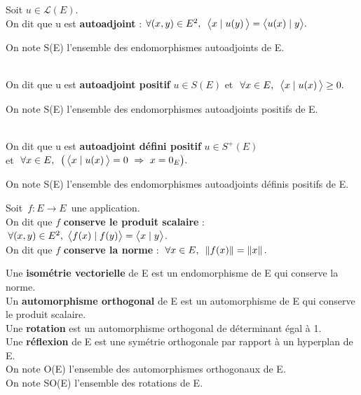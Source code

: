 Soit \(u\in \mathscr{L}(E)\).\vspace{0.1cm}\\
On dit que u est \textbf{autoadjoint} \ssi : \(\forall (x,y)\in E^2,\ \, \bigl\langle x\mid u(y)\, \bigr\rangle=\bigl\langle u(x)\mid y \bigr\rangle.\)\vspace{0.1cm}\\
\begin{small}
    On note S(E) l'ensemble des endomorphismes autoadjoints de E.
\end{small}\vspace{0.5cm}\\
On dit que u est \textbf{autoadjoint positif} \ssi \(u\in S(E)\) et \(\ \forall x\in E,\ \,\bigl\langle x\mid u(x)\, \bigr\rangle\geq 0.\)\vspace{0.1cm}\\
\begin{small}
    On note S\expo{+}(E) l'ensemble des endomorphismes autoadjoints positifs de E.
\end{small}\vspace{0.5cm}\\
On dit que u est \textbf{autoadjoint défini positif} \ssi \(u\in S^+(E)\)\\
et \(\ \forall x\in E,\ \,\bigl(\,\psm{x}{u(x)\,}=0\ \Rightarrow \ x=0_E \bigr).\)\vspace{0.1cm}\\
\begin{small}
    On note S\expo{++}(E) l'ensemble des endomorphismes autoadjoints définis positifs de E.
\end{small}

\vspace{1.3cm}

Soit \(\,f:E\to E\,\) une application.\vspace{0.1cm}\\
On dit que $f$ \textbf{conserve le produit scalaire} \ssi : \(\, \forall (x,y)\in E^2,\ \psm{f(x)}{f(y)}=\psm{x}{y}\).\vspace{0.2cm}\\
On dit que $f$ \textbf{conserve la norme} \ssi : \(\; \forall x\in E,\ \, \left\lVert f(x)\right\rVert=\left\lVert x\right\rVert.\)

\vspace{1cm}

\noindent Une \textbf{isométrie vectorielle} de E est un endomorphisme de E qui conserve la norme.\\
Un \textbf{automorphisme orthogonal} de E est un automorphisme de E qui conserve le produit scalaire.\\
Une \textbf{rotation} est un automorphisme orthogonal de déterminant égal à 1.\\
Une \textbf{réflexion} de E est une symétrie orthogonale par rapport à un hyperplan de E.\vspace{0.2cm}\\
On note O(E) l'ensemble des automorphismes orthogonaux de E.\\
On note SO(E) l'ensemble des rotations de E. 

